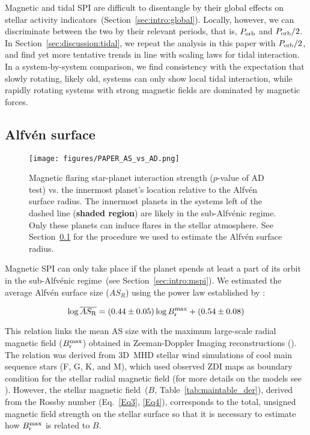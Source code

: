 \documentclass[twocolumn]{aastex631}
\begin{document}
Magnetic and tidal SPI are difficult to disentangle by their global effects on stellar activity indicators~(Section~\ref{sec:intro:global}). Locally, however, we can discriminate between the two by their relevant periods, that is, $P_{\rm orb}$ and $P_{\rm orb} /2$. In Section~\ref{sec:discussion:tidal}, we repeat the analysis in this paper with $P_{\rm orb}/2$, and find yet more tentative trends in line with scaling laws for tidal interaction. In a system-by-system comparison, we find consistency with the expectation that slowly rotating, likely old, systems can only show local tidal interaction, while rapidly rotating systems with strong magnetic fields are dominated by magnetic forces.
\subsection{Alfv\'en surface}
\label{sec:discussion:as}

\begin{figure}[t]
    \begin{centering}
        \texttt{[image: figures/PAPER\_AS\_vs\_AD.png]}
    \caption{Magnetic flaring star-planet interaction strength ($p$-value of AD test) vs. the innermost planet's location relative to the Alfv\'en surface radius. The innermost planets in the systems left of the dashed line (\textbf{shaded region}) are likely in the sub-Alfv\'enic regime. Only these planets can induce flares in the stellar atmosphere. See Section~\ref{sec:discussion:as} for the procedure we used to estimate the Alfv\'en surface radius. }
        \label{fig:as}
    \end{centering}
\end{figure}

Magnetic SPI can only take place if the planet spends at least a part of its orbit in the sub-Alfv\'enic regime~(see Section~\ref{sec:intro:mspi}). We estimated the average Alfv\'en surface size ($\overline{AS}_{R}$) using the power law established by \citet{chebly2023numerical}:

\begin{equation}
    \log \overline{AS_{\rm R}} = (0.44 \pm 0.05) \log B_{\rm r}^{\rm max} + (0.54 \pm 0.08)\label{AS_estimation}
\end{equation}

This relation links the mean AS size with the maximum large-scale radial magnetic field ($B_{\rm r}^{\rm max}$) obtained in Zeeman-Doppler Imaging reconstructions (\citealt{donati2006surprising, morin2008largescale, fares2009magnetic, alvarado-gomez2015activity, hussain2016spectropolarimetric, kochukhov2020mapping}). The relation was derived from 3D~MHD stellar wind simulations of cool main sequence stars (F, G, K, and M), which used observed ZDI maps as boundary condition for the stellar radial magnetic field (for more details on the models see \citealt{chebly2023numerical}). However, the stellar magnetic field~($B$, Table~\ref{tab:maintable_der}), derived from the Rossby number (Eq.~\ref{Eq3}, \ref{Eq4}), corresponds to the total, unsigned magnetic field strength on the stellar surface so that it is necessary to estimate how $B_{\rm r}^{\rm max}$ is related to $B$. 
\end{document}
